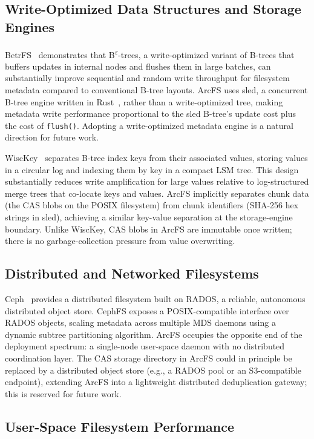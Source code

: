 \documentclass[5p,times]{elsarticle}
\begin{document}
\subsection{Write-Optimized Data Structures and Storage Engines}

BetrFS~\cite{jannen2015betrfs} demonstrates that B\textsuperscript{$\varepsilon$}-trees,
a write-optimized variant of B-trees that buffers updates in internal nodes
and flushes them in large batches, can substantially improve sequential and
random write throughput for filesystem metadata compared to conventional
B-tree layouts.  ArcFS uses sled, a concurrent B-tree engine written in
Rust~\cite{sled2024}, rather than a write-optimized tree, making metadata
write performance proportional to the sled B-tree's update cost plus the
cost of \texttt{flush()}.  Adopting a write-optimized metadata engine is a
natural direction for future work.

WiscKey~\cite{lu2017wisckey} separates B-tree index keys from their
associated values, storing values in a circular log and indexing them by
key in a compact LSM tree. This design substantially reduces write
amplification for large values relative to log-structured merge trees that
co-locate keys and values. ArcFS implicitly separates chunk data (the
CAS blobs on the POSIX filesystem) from chunk identifiers (SHA-256 hex
strings in sled), achieving a similar key-value separation at the
storage-engine boundary. Unlike WiscKey, CAS blobs in ArcFS are immutable
once written; there is no garbage-collection pressure from value overwriting.

\subsection{Distributed and Networked Filesystems}

Ceph~\cite{weil2006ceph} provides a distributed filesystem built on RADOS,
a reliable, autonomous distributed object store. CephFS exposes a
POSIX-compatible interface over RADOS objects, scaling metadata across
multiple MDS daemons using a dynamic subtree partitioning algorithm.
ArcFS occupies the opposite end of the deployment spectrum: a single-node
user-space daemon with no distributed coordination layer.  The CAS storage
directory in ArcFS could in principle be replaced by a distributed
object store (e.g., a RADOS pool or an S3-compatible endpoint), extending
ArcFS into a lightweight distributed deduplication gateway; this is
reserved for future work.

\subsection{User-Space Filesystem Performance}
\end{document}

